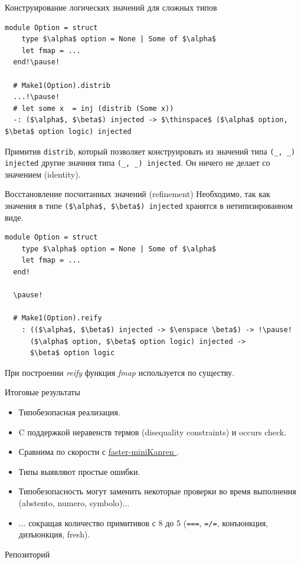 \documentclass[10pt, mathserif]{beamer}
\theoremstyle{definition}
\begin{document}
\begin{frame}[fragile]{Конструирование логических значений для сложных типов}
  \begin{lstlisting}[mathescape=true]
  module Option = struct
    type $\alpha$ option = None | Some of $\alpha$
    let fmap = ...
  end!\pause!

  # Make1(Option).distrib
  ...!\pause!
  # let some x  = inj (distrib (Some x))
  -: ($\alpha$, $\beta$) injected -> $\thinspace$ ($\alpha$ option, $\beta$ option logic) injected
  \end{lstlisting}
  \pause

  Примитив \lstinline{distrib}, который позволяет конструировать из значений типа \lstinline{(_, _) injected} 
  другие значния типа \lstinline{(_, _) injected}.
  \vskip 1cm
  Он ничего не делает со значением (identity).
  

\end{frame}

\begin{frame}[fragile]{Восстановление посчитанных значений (refinement)}
  Необходимо, так как значения в типе \lstinline[mathescape=true]{($\alpha$, $\beta$) injected} хранятся в
  нетипизированном виде.

  \begin{lstlisting}[mathescape=true]
  module Option = struct
    type $\alpha$ option = None | Some of $\alpha$
    let fmap = ...
  end!

  \pause!

  # Make1(Option).reify
    : (($\alpha$, $\beta$) injected -> $\enspace \beta$) -> !\pause!
      ($\alpha$ option, $\beta$ option logic) injected -> 
      $\beta$ option logic

  \end{lstlisting}

  При построении \emph{reify} функция \emph{fmap} используется по существу.
\end{frame}

\begin{frame}[fragile]{Итоговые результаты}

\begin{itemize}
 \item Типобезопасная реализация.
 \item C поддержкой неравенств термов (disequality constraints) и occurs check.
 \item Сравнима по скорости с \href{https://github.com/michaelballantyne/faster-miniKanren/}{faster-miniKanren \faGithub}.
 \item Типы выявляют простые ошибки.
 \item Типобезопасность могут заменить некоторые проверки во время выполнения (abstento, numero, symbolo)...
 \item ... сокращая количество примитивов с 8 до 5 
 (\lstinline{===}, \lstinline{=/=}, конъюнкция, дизъюнкция, fresh).
\end{itemize}

\vskip 2cm
Репозиторий \href{https://github.com/dboulytchev/OCanren}{\faGithub}
\end{frame}
\end{document}
